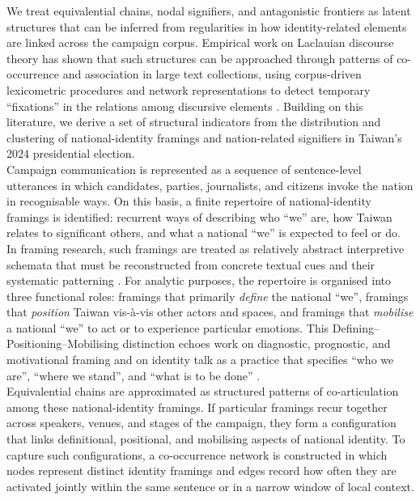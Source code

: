 \documentclass[man,12pt]{apa7}
\begin{document}
We treat equivalential chains, nodal signifiers, and antagonistic frontiers as latent structures that can be inferred from regularities in how identity-related elements are linked across the campaign corpus. 
Empirical work on Laclauian discourse theory has shown that such structures can be approached through patterns of co-occurrence and association in large text collections, 
using corpus-driven lexicometric procedures and network representations to detect temporary ``fixations'' in the relations among discursive elements \parencite{felgenhauer2007,glasze2007,bakumov2022}. 
Building on this literature, we derive a set of structural indicators from the distribution and clustering of national-identity framings and nation-related signifiers in Taiwan's 2024 presidential election.\\%
Campaign communication is represented as a sequence of sentence-level utterances in which candidates, parties, journalists, and citizens invoke the nation in recognisable ways. 
On this basis, a finite repertoire of national-identity framings is identified: recurrent ways of describing who ``we'' are, how Taiwan relates to significant others, and what a national ``we'' is expected to feel or do. 
In framing research, such framings are treated as relatively abstract interpretive schemata that must be reconstructed from concrete textual cues and their systematic patterning \parencite{matthes2008}. 
For analytic purposes, the repertoire is organised into three functional roles: framings that primarily \emph{define} the national ``we'', framings that \emph{position} Taiwan vis-à-vis other actors and spaces, and framings that \emph{mobilise} a national ``we'' to act or to experience particular emotions. 
This Defining–Positioning–Mobilising distinction echoes work on diagnostic, prognostic, and motivational framing and on identity talk as a practice that specifies ``who we are'', ``where we stand'', and ``what is to be done'' \parencite{benford2000,snow2019}.\\%
Equivalential chains are approximated as structured patterns of co-articulation among these national-identity framings. 
If particular framings recur together across speakers, venues, and stages of the campaign, they form a configuration that links definitional, positional, and mobilising aspects of national identity. 
To capture such configurations, a co-occurrence network is constructed in which nodes represent distinct identity framings and edges record how often they are activated jointly within the same sentence or in a narrow window of local context. 
\end{document}
